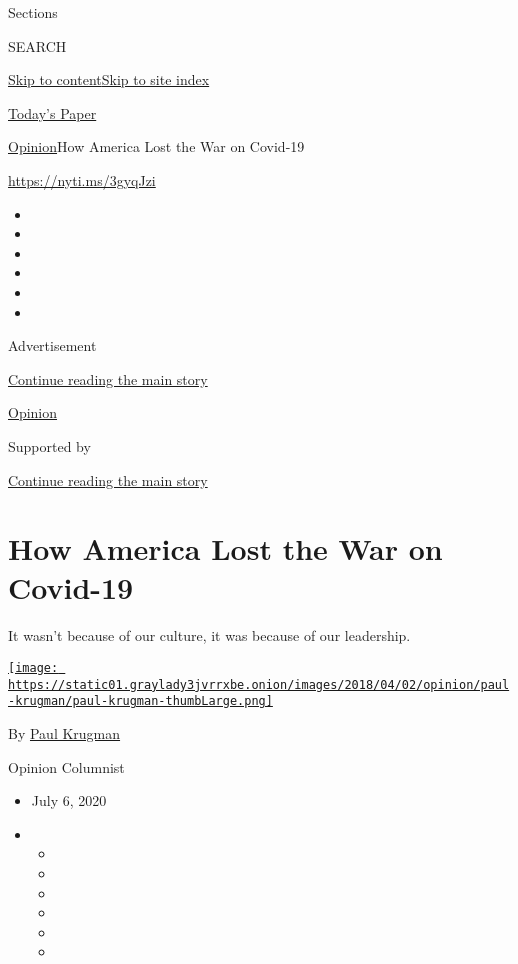 Sections

SEARCH

\protect\hyperlink{site-content}{Skip to
content}\protect\hyperlink{site-index}{Skip to site index}

\href{https://myaccount.nytimes3xbfgragh.onion/auth/login?response_type=cookie\&client_id=vi}{}

\href{https://www.nytimes3xbfgragh.onion/section/todayspaper}{Today's
Paper}

\href{/section/opinion}{Opinion}\textbar{}How America Lost the War on
Covid-19

\url{https://nyti.ms/3gyqJzi}

\begin{itemize}
\item
\item
\item
\item
\item
\item
\end{itemize}

Advertisement

\protect\hyperlink{after-top}{Continue reading the main story}

\href{/section/opinion}{Opinion}

Supported by

\protect\hyperlink{after-sponsor}{Continue reading the main story}

\hypertarget{how-america-lost-the-war-on-covid-19}{%
\section{How America Lost the War on
Covid-19}\label{how-america-lost-the-war-on-covid-19}}

It wasn't because of our culture, it was because of our leadership.

\href{https://www.nytimes3xbfgragh.onion/by/paul-krugman}{\texttt{[image: https://static01.graylady3jvrrxbe.onion/images/2018/04/02/opinion/paul-krugman/paul-krugman-thumbLarge.png]}}

By \href{https://www.nytimes3xbfgragh.onion/by/paul-krugman}{Paul
Krugman}

Opinion Columnist

\begin{itemize}
\item
  July 6, 2020
\item
  \begin{itemize}
  \item
  \item
  \item
  \item
  \item
  \item
  \end{itemize}
\end{itemize}

